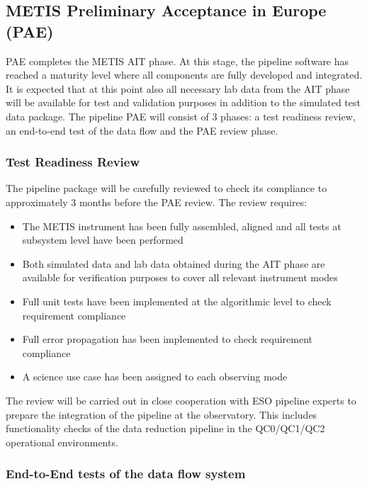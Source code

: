 \subsection{METIS Preliminary Acceptance in Europe (PAE)}
\label{ssec:pae_europe}

PAE completes the METIS AIT phase. At this stage, the pipeline software has reached a maturity level where all components are fully developed and integrated. It is expected that at this point also all necessary lab data from the AIT phase will be available for test and validation purposes in addition to the simulated test data package. The pipeline PAE will consist of 3 phases: a test readiness review, an end-to-end test of the data flow and the PAE review phase.

\subsubsection{Test Readiness Review}
\label{sssec:trr}

The pipeline package will be carefully reviewed to check its compliance to \cite{1618} approximately 3 months before the PAE review. The review requires:
\begin{itemize}
    \item The METIS instrument has been fully assembled, aligned and all tests at subsystem level have been performed
    \item Both simulated data and lab data obtained during the AIT phase are available for verification purposes to cover all relevant instrument modes
    \item Full unit tests have been implemented at the algorithmic level to check requirement compliance
    \item Full error propagation has been implemented to check requirement compliance
    \item A science use case has been assigned to each observing mode
\end{itemize}
The review will be carried out in close cooperation with ESO pipeline experts to prepare the integration of the pipeline at the observatory. This includes functionality checks of the data reduction pipeline in the QC0/QC1/QC2 operational environments.

\subsubsection{End-to-End tests of the data flow system}
\label{sssec:e2e}

